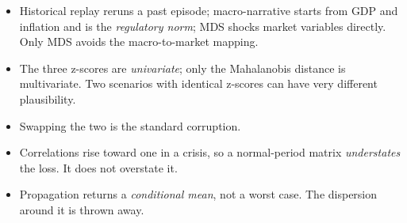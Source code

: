 \begin{imtrapbox}[title={Consolidated trap summary --- IM-15}]
\begin{itemize}
\item {} Historical replay reruns a past episode;
macro-narrative starts from GDP and inflation and is the \emph{regulatory norm};
MDS shocks market variables directly. Only MDS avoids the macro-to-market mapping.
\item {} The three z-scores are \emph{univariate}; only the
Mahalanobis distance is multivariate. Two scenarios with identical z-scores can
have very different plausibility.
\item {}  Swapping the two is the standard corruption.
\item {} Correlations rise toward one in a crisis, so a
normal-period matrix \emph{understates} the loss. It does not overstate it.
\item {} Propagation returns a \emph{conditional mean},
not a worst case. The dispersion around it is thrown away.
\end{itemize}
\end{imtrapbox}

